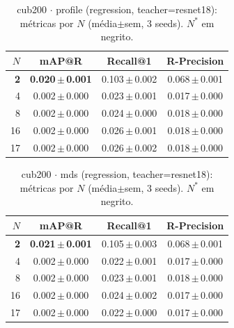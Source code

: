 \begin{table}[t]\centering
\caption{cub200 $\cdot$ profile (regression, teacher=resnet18): métricas por $N$ (média$\pm$sem, 3 seeds). $N^*$ em negrito.}
\begin{tabular}{rccc}\toprule
$N$ & mAP@R & Recall@1 & R-Precision \\ \midrule
\textbf{2} & \textbf{0.020\,$\pm$\,0.001} & 0.103\,$\pm$\,0.002 & 0.068\,$\pm$\,0.001 \\
4 & 0.002\,$\pm$\,0.000 & 0.023\,$\pm$\,0.001 & 0.017\,$\pm$\,0.000 \\
8 & 0.002\,$\pm$\,0.000 & 0.024\,$\pm$\,0.000 & 0.018\,$\pm$\,0.000 \\
16 & 0.002\,$\pm$\,0.000 & 0.026\,$\pm$\,0.001 & 0.018\,$\pm$\,0.000 \\
17 & 0.002\,$\pm$\,0.000 & 0.026\,$\pm$\,0.002 & 0.018\,$\pm$\,0.000 \\
\bottomrule\end{tabular}\end{table}

\begin{table}[t]\centering
\caption{cub200 $\cdot$ mds (regression, teacher=resnet18): métricas por $N$ (média$\pm$sem, 3 seeds). $N^*$ em negrito.}
\begin{tabular}{rccc}\toprule
$N$ & mAP@R & Recall@1 & R-Precision \\ \midrule
\textbf{2} & \textbf{0.021\,$\pm$\,0.001} & 0.105\,$\pm$\,0.003 & 0.068\,$\pm$\,0.001 \\
4 & 0.002\,$\pm$\,0.000 & 0.022\,$\pm$\,0.001 & 0.017\,$\pm$\,0.000 \\
8 & 0.002\,$\pm$\,0.000 & 0.023\,$\pm$\,0.001 & 0.018\,$\pm$\,0.000 \\
16 & 0.002\,$\pm$\,0.000 & 0.024\,$\pm$\,0.002 & 0.017\,$\pm$\,0.000 \\
17 & 0.002\,$\pm$\,0.000 & 0.022\,$\pm$\,0.000 & 0.017\,$\pm$\,0.000 \\
\bottomrule\end{tabular}\end{table}
